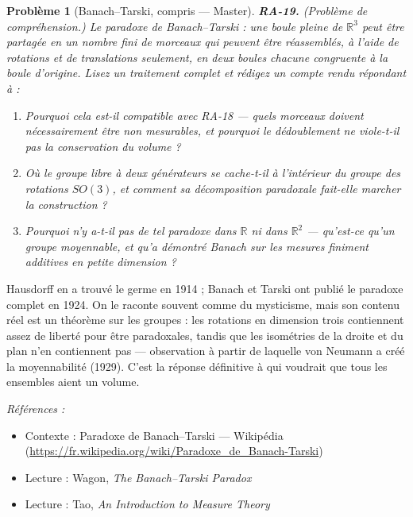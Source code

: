 \documentclass[11pt]{article}
\newtheorem{problem}{Problème}
\newenvironment{refs}{\par\small\noindent\emph{Références :}\begin{itemize}\setlength\itemsep{0pt}}{\end{itemize}\normalsize}
\begin{document}
\begin{problem}[{Banach--Tarski, compris --- Master}]
\textbf{RA-19.} (Problème de compréhension.) Le paradoxe de Banach--Tarski : une
boule pleine de $ \mathbb{R}^3 $ peut être partagée en un nombre fini de morceaux qui peuvent être
réassemblés, à l'aide de rotations et de translations seulement, en deux boules chacune congruente à
la boule d'origine. Lisez un traitement complet et rédigez un compte rendu répondant à :
\begin{enumerate}
\item[(a)] Pourquoi cela est-il compatible
avec RA-18 --- quels morceaux doivent nécessairement être non mesurables, et pourquoi le
\og{} dédoublement \fg{} ne viole-t-il pas la conservation du volume ?
\item[(b)] Où le groupe libre à deux générateurs se cache-t-il à l'intérieur du
groupe des rotations $ SO(3) $, et comment sa décomposition paradoxale fait-elle marcher la
construction ?
\item[(c)] Pourquoi n'y a-t-il pas de tel paradoxe dans $ \mathbb{R} $ ni dans $ \mathbb{R}^2 $ ---
qu'est-ce qu'un groupe moyennable, et qu'a démontré Banach sur les mesures finiment additives en
petite dimension ?
\end{enumerate}

\end{problem}

\noindent Hausdorff en a trouvé le germe en 1914 ; Banach et Tarski ont publié le paradoxe
complet en 1924. On le raconte souvent comme du mysticisme, mais son contenu réel est un théorème
sur les groupes : les rotations en dimension trois contiennent assez de liberté pour être
paradoxales, tandis que les isométries de la droite et du plan n'en contiennent pas --- observation à
partir de laquelle von Neumann a créé la moyennabilité (1929). C'est la réponse définitive à qui
voudrait que tous les ensembles aient un volume.

\begin{refs}
\item Contexte : Paradoxe de Banach--Tarski --- Wikipédia (\url{https://fr.wikipedia.org/wiki/Paradoxe_de_Banach-Tarski})
\item Lecture : Wagon, \textit{The Banach--Tarski Paradox}
\item Lecture : Tao, \textit{An Introduction to Measure Theory}
\end{refs}

\bigskip
\end{document}
